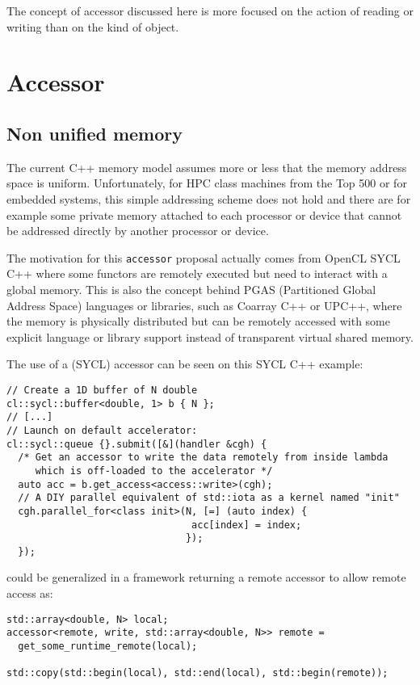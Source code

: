 \documentclass[a4paper]{article}
\begin{document}
The concept of accessor discussed here is more focused on the action
of reading or writing than on the kind of object.


\section{Accessor}
\label{sec:accessor}

\subsection{Non unified memory}
\label{sec:non-unified-memory}

The current C++ memory model assumes more or less that the memory
address space is uniform. Unfortunately, for HPC class machines from
the Top 500 or for embedded systems, this simple addressing scheme
does not hold and there are for example some private memory attached
to each processor or device that cannot be addressed directly by
another processor or device.

The motivation for this \lstinline|accessor| proposal actually comes
from OpenCL SYCL C++ where some functors are remotely executed but need
to interact with a global memory. This is also the concept behind PGAS
(Partitioned Global Address Space) languages or libraries, such as
Coarray C++ or UPC++, where the memory is physically distributed but
can be remotely accessed with some explicit language or library
support instead of transparent virtual shared memory.

The use of a (SYCL) accessor can be seen on this SYCL C++ example:
\begin{lstlisting}
// Create a 1D buffer of N double
cl::sycl::buffer<double, 1> b { N };
// [...]
// Launch on default accelerator:
cl::sycl::queue {}.submit([&](handler &cgh) {
  /* Get an accessor to write the data remotely from inside lambda
     which is off-loaded to the accelerator */
  auto acc = b.get_access<access::write>(cgh);
  // A DIY parallel equivalent of std::iota as a kernel named "init"
  cgh.parallel_for<class init>(N, [=] (auto index) {
                                acc[index] = index;
                               });
  });
\end{lstlisting}

could be generalized in a framework returning a remote accessor to
allow remote access as:
\begin{lstlisting}
std::array<double, N> local;
accessor<remote, write, std::array<double, N>> remote =
  get_some_runtime_remote(local);

std::copy(std::begin(local), std::end(local), std::begin(remote));
\end{lstlisting}
\end{document}
